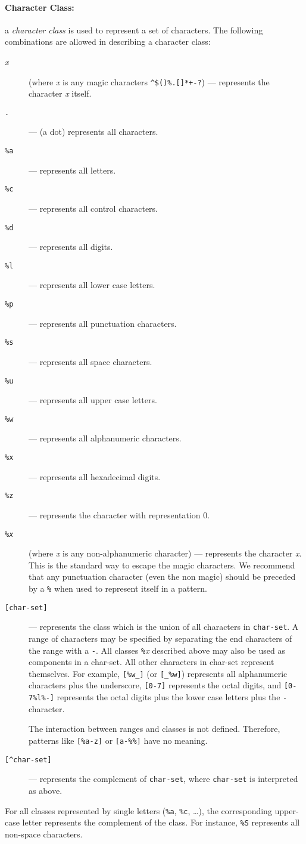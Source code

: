 \documentclass[11pt]{article}
\newcommand{\M}[1]{{\rm\emph{#1}}}
\newcommand{\T}[1]{{\tt #1}}
\newcommand{\Def}[1]{\emph{#1}\index{#1}}
\begin{document}
\paragraph{Character Class:}
a \Def{character class} is used to represent a set of characters.
The following combinations are allowed in describing a character class:
\begin{description}
\item[\emph{x}] (where \emph{x} is any magic characters
\verb|^$()%.[]*+-?|)
--- represents the character \emph{x} itself.
\item[\T{.}] --- (a dot) represents all characters.
\item[\T{\%a}] --- represents all letters.
\item[\T{\%c}] --- represents all control characters.
\item[\T{\%d}] --- represents all digits.
\item[\T{\%l}] --- represents all lower case letters.
\item[\T{\%p}] --- represents all punctuation characters.
\item[\T{\%s}] --- represents all space characters.
\item[\T{\%u}] --- represents all upper case letters.
\item[\T{\%w}] --- represents all alphanumeric characters.
\item[\T{\%x}] --- represents all hexadecimal digits.
\item[\T{\%z}] --- represents the character with representation 0.
\item[\T{\%\M{x}}] (where \M{x} is any non-alphanumeric character)  ---
represents the character \M{x}.
This is the standard way to escape the magic characters.
We recommend that any punctuation character (even the non magic)
should be preceded by a \verb|%|
when used to represent itself in a pattern.

\item[\T{[char-set]}] ---
represents the class which is the union of all
characters in \verb|char-set|.
A range of characters may be specified by
separating the end characters of the range with a \verb|-|.
All classes \verb|%|\emph{x} described above may also be used as
components in a char-set.
All other characters in char-set represent themselves.
For example, \verb|[%w_]| (or \verb|[_%w]|)
represents all alphanumeric characters plus the underscore,
\verb|[0-7]| represents the octal digits,
and \verb|[0-7%l%-]| represents the octal digits plus
the lower case letters plus the \verb|-| character.

The interaction between ranges and classes is not defined.
Therefore, patterns like \verb|[%a-z]| or \verb|[a-%%]|
have no meaning.

\item[\T{[\^\null char-set]}] ---
represents the complement of \verb|char-set|,
where \verb|char-set| is interpreted as above.
\end{description}
For all classes represented by single letters (\verb|%a|, \verb|%c|, \ldots),
the corresponding upper-case letter represents the complement of the class.
For instance, \verb|%S| represents all non-space characters.
\end{document}
